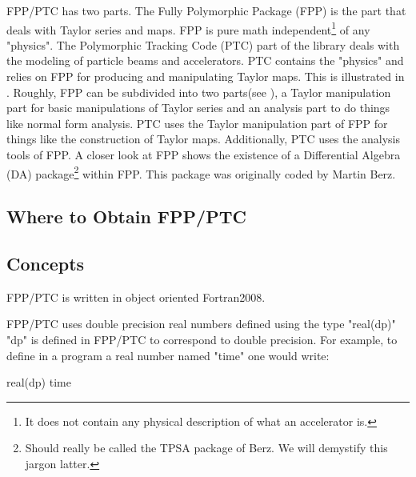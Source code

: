 \documentclass[english,12pt,article]{article} %
\begin{document}
FPP/PTC has two parts. The Fully Polymorphic Package (FPP) is the part that deals with Taylor series and maps. FPP is pure math independent\footnote{It does not contain any physical description of what an accelerator is. } of any "physics". The Polymorphic Tracking Code (PTC) part of the library deals with the modeling of particle beams and accelerators. PTC contains the "physics" and relies on FPP for producing and manipulating Taylor maps. This is illustrated in . Roughly, FPP can be subdivided into two parts(see ), a Taylor manipulation part for basic manipulations of Taylor series and an analysis part to do things like normal form analysis. PTC uses the Taylor manipulation part of FPP for things like the construction of Taylor maps. Additionally, PTC uses the analysis tools of FPP. A closer look at FPP shows the existence of a Differential Algebra (DA) package\footnote{Should really be called the TPSA package of Berz. We will demystify this jargon latter.} within FPP. This package was originally coded by Martin Berz.

\subsection{Where to Obtain FPP/PTC}

\subsection{Concepts}\label{s:concepts}

FPP/PTC is written in object oriented Fortran2008. 

FPP/PTC uses double precision real numbers defined using the type "real(dp)" "dp" is defined in FPP/PTC to correspond to double precision. For example, to define in a program a real number named "time" one would write:
\begin{example}
  real(dp) time
\end{example}
\end{document}
